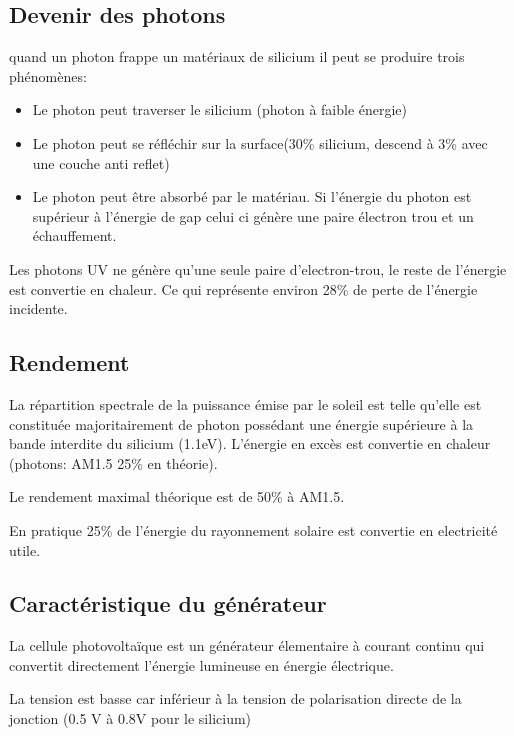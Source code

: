 \documentclass[main.tex]{subfiles}
\begin{document}
\subsection{Devenir des photons}


quand un photon frappe un matériaux de silicium il peut se  produire trois phénomènes:
\begin{itemize}
\item Le photon peut traverser le silicium (photon à faible énergie)
\item Le photon peut se réfléchir sur la surface(30\% silicium, descend à 3\% avec une couche anti reflet)
\item Le photon peut être absorbé par le matériau. Si l'énergie du photon est supérieur à l'énergie de gap celui ci génère une paire électron trou et un échauffement.
\end{itemize}
\begin{rem}
  Les photons UV ne génère qu'une seule paire d'electron-trou, le reste de l'énergie est convertie en chaleur. Ce qui représente environ 28\% de perte  de l'énergie incidente.
\end{rem}

\subsection{Rendement}

La répartition spectrale de la puissance émise par le soleil est telle qu'elle est constituée majoritairement de photon possédant une énergie supérieure à la bande interdite du silicium (1.1eV). L'énergie en excès est convertie en chaleur (photons: AM1.5 25\% en théorie).

Le rendement maximal théorique est de 50\% à AM1.5.

\begin{prop}
  En pratique 25\% de l'énergie du rayonnement solaire est convertie en electricité utile.
\end{prop}


\subsection{Caractéristique du générateur}
\begin{defin}
  La cellule photovoltaïque est un générateur élementaire à courant continu qui convertit directement l'énergie lumineuse en énergie électrique.

\end{defin}
La tension est basse car inférieur à la tension de polarisation directe de la jonction (0.5 V à 0.8V pour le silicium)
\end{document}
